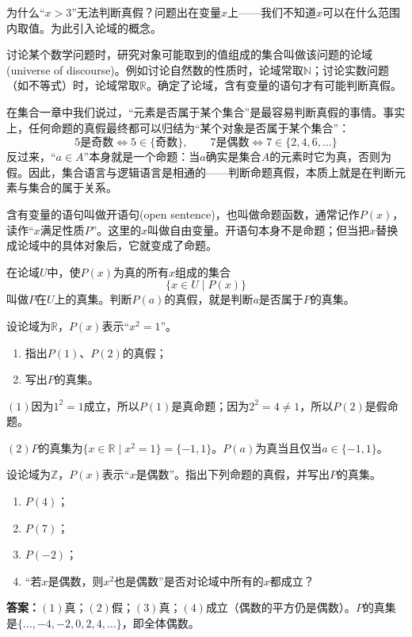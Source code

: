 为什么“$x>3$”无法判断真假？问题出在变量$x$上——我们不知道$x$可以在什么范围内取值。为此引入论域的概念。

\begin{definition}[论域]
讨论某个数学问题时，研究对象可能取到的值组成的集合叫做该问题的论域(universe of discourse)。例如讨论自然数的性质时，论域常取$\mathbb{N}$；讨论实数问题（如不等式）时，论域常取$\mathbb{R}$。确定了论域，含有变量的语句才有可能判断真假。
\end{definition}

\begin{att}
在集合一章中我们说过，“元素是否属于某个集合”是最容易判断真假的事情。事实上，任何命题的真假最终都可以归结为“某个对象是否属于某个集合”：
\[
5\text{是奇数} \iff 5\in \{\text{奇数}\},\qquad
7\text{是偶数} \iff 7\in \{2,4,6,\ldots\}
\]
反过来，“$a\in A$”本身就是一个命题：当$a$确实是集合$A$的元素时它为真，否则为假。因此，集合语言与逻辑语言是相通的——判断命题真假，本质上就是在判断元素与集合的属于关系。
\end{att}

\begin{definition}[谓词与开语句]
含有变量的语句叫做开语句(open sentence)，也叫做命题函数，通常记作$P(x)$，读作“$x$满足性质$P$”。这里的$x$叫做自由变量。开语句本身不是命题；但当把$x$替换成论域中的具体对象后，它就变成了命题。

在论域$U$中，使$P(x)$为真的所有$x$组成的集合
\[\{x\in U\mid P(x)\}\]
叫做$P$在$U$上的真集。判断$P(a)$的真假，就是判断$a$是否属于$P$的真集。
\end{definition}

\begin{example}
设论域为$\mathbb{R}$，$P(x)$表示“$x^2=1$”。
\begin{enumerate}
    \item 指出$P(1)$、$P(2)$的真假；
    \item 写出$P$的真集。
\end{enumerate}
\end{example}
\begin{jie}
    $(1)$因为$1^2=1$成立，所以$P(1)$是真命题；因为$2^2=4\neq 1$，所以$P(2)$是假命题。

    $(2)$$P$的真集为$\{x\in\mathbb{R}\mid x^2=1\}=\{-1,1\}$。$P(a)$为真当且仅当$a\in\{-1,1\}$。
\end{jie}

\begin{exercise}
设论域为$\mathbb{Z}$，$P(x)$表示“$x$是偶数”。指出下列命题的真假，并写出$P$的真集。
\begin{enumerate}
    \item $P(4)$；
    \item $P(7)$；
    \item $P(-2)$；
    \item “若$x$是偶数，则$x^2$也是偶数”是否对论域中所有的$x$都成立？
\end{enumerate}
\end{exercise}
\textbf{答案：}$(1)$真；$(2)$假；$(3)$真；$(4)$成立（偶数的平方仍是偶数）。$P$的真集是$\{\ldots,-4,-2,0,2,4,\ldots\}$，即全体偶数。

